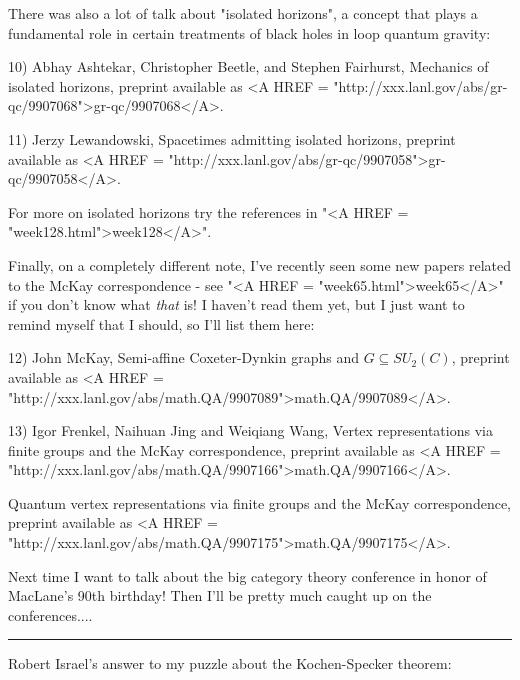 There was also a lot of talk about "isolated horizons", a concept
that plays a fundamental role in certain treatments of black holes
in loop quantum gravity:

10) Abhay Ashtekar, Christopher Beetle, and Stephen Fairhurst, 
Mechanics of isolated horizons, preprint available as <A HREF = "http://xxx.lanl.gov/abs/gr-qc/9907068">gr-qc/9907068</A>.

11) Jerzy Lewandowski, Spacetimes admitting isolated horizons, 
preprint available as <A HREF = "http://xxx.lanl.gov/abs/gr-qc/9907058">gr-qc/9907058</A>.

For more on isolated horizons try the references in "<A HREF = "week128.html">week128</A>".  
 
Finally, on a completely different note, I've recently seen some
new papers related to the McKay correspondence - see "<A HREF = "week65.html">week65</A>" if
you don't know what \emph{that} is!  I haven't read them yet, but I 
just want to remind myself that I should, so I'll list them here:

12) John McKay, Semi-affine Coxeter-Dynkin graphs and $G \subseteq
SU_2(C)$, preprint available as <A HREF = "http://xxx.lanl.gov/abs/math.QA/9907089">math.QA/9907089</A>.

13) Igor Frenkel, Naihuan Jing and Weiqiang Wang, Vertex 
representations via finite groups and the McKay correspondence,
preprint available as <A HREF = "http://xxx.lanl.gov/abs/math.QA/9907166">math.QA/9907166</A>.

Quantum vertex
representations via finite groups and the McKay correspondence,
preprint available as <A HREF = "http://xxx.lanl.gov/abs/math.QA/9907175">math.QA/9907175</A>.

Next time I want to talk about the big category theory conference
in honor of MacLane's 90th birthday!  Then I'll be pretty much
caught up on the conferences....


\par\noindent\rule{\textwidth}{0.4pt}
Robert Israel's answer to my puzzle about the Kochen-Specker theorem:

